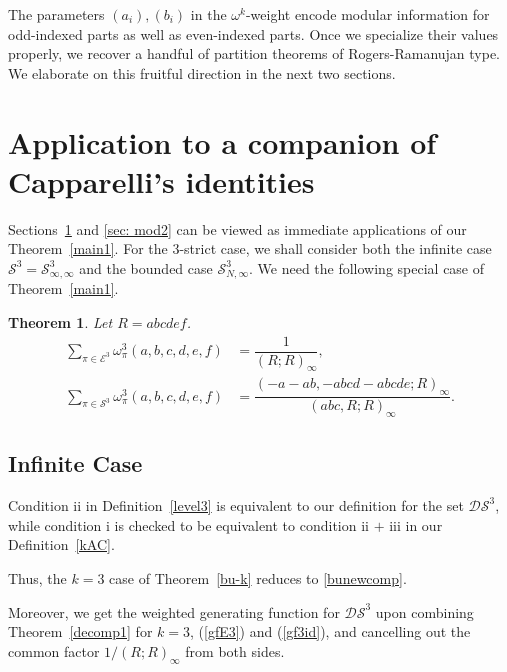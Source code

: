\documentclass[12pt]{amsart}
\numberwithin{equation}{section}
\theoremstyle{plain}
\newtheorem{theorem}{Theorem}[section]
\theoremstyle{definition}
\begin{document}
The parameters $(a_i),(b_i)$ in the $\omega^k$-weight encode modular information for odd-indexed parts as well as even-indexed parts. Once we specialize their values properly, we recover a handful of partition theorems of Rogers-Ramanujan type. We elaborate on this fruitful direction in the next two sections.



\section{Application to a companion of Capparelli's identities}\label{sec: mod3}

Sections~\ref{sec: mod3} and \ref{sec: mod2} can be viewed as immediate applications of our Theorem~\ref{main1}. For the $3$-strict case,  we shall consider both the infinite case $\mathcal{S}^3=\mathcal{S}^3_{\infty,\infty}$ and the bounded case $\mathcal{S}^3_{N,\infty}$. We need the following special case of Theorem~\ref{main1}.
\begin{theorem}\label{gf32strict} Let $R=abcdef$. 
\begin{align}

\label{gfE3}\sum\limits_{\pi\in \mathcal{E}^3}\omega^3_{\pi}(a,b,c,d,e,f) &=\dfrac{1}{(R;R)_{\infty}},\\


\label{gf3id}
\sum\limits_{\pi\in\mathcal{S}^3}\omega^3_{\pi}(a,b,c,d,e,f)&=\dfrac{(-a-ab,-abcd-abcde;R)_{\infty}}{(abc,R;R)_{\infty}}.
\end{align}
\end{theorem}


\subsection{Infinite Case}






Condition ii in Definition~\ref{level3} is equivalent to our definition for the set $\mathcal{DS}^3$, while condition i is checked to be equivalent to condition ii $+$ iii in our Definition~\ref{kAC}. 

Thus,  the $k=3$ case of  Theorem~\ref{bu-k} reduces to \eqref{bunewcomp}.





Moreover, we get the weighted generating function for $\mathcal{DS}^3$ upon combining Theorem~\ref{decomp1} for $k=3$, (\ref{gfE3}) and (\ref{gf3id}), and cancelling out the common factor $1/(R;R)_{\infty}$ from both sides.
\end{document}
